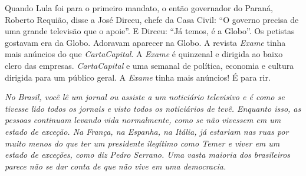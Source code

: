 \normalfont 
Quando Lula foi para o primeiro mandato, o então
governador do Paraná, Roberto Requião, disse a José Dirceu, chefe da
Casa Civil: ``O governo precisa de uma grande televisão que o apoie''. E
Dirceu: ``Já temos, é a Globo''. Os petistas gostavam era da Globo.
Adoravam aparecer na Globo. A revista \emph{Exame} tinha mais anúncios
do que \emph{CartaCapital}. A \emph{Exame} é quinzenal e dirigida ao
baixo clero das empresas. \emph{CartaCapital} e uma semanal de política,
economia e cultura dirigida para um público geral. A \emph{Exame} tinha
mais anúncios! É para rir.

\itshape
No Brasil, você lê um jornal ou assiste a um noticiário
televisivo e é como se tivesse lido todos os jornais e visto todos os
noticiários de tevê. Enquanto isso, as pessoas continuam levando vida
normalmente, como se não vivessem em um estado de exceção. Na França, na
Espanha, na Itália, já estariam nas ruas por muito menos do que ter um
presidente ilegítimo como Temer e viver em um estado de exceções, como
diz Pedro Serrano. Uma vasta maioria dos brasileiros parece não se dar
conta de que não vive em uma democracia.

